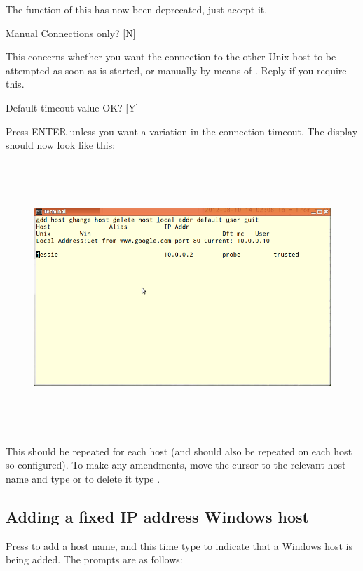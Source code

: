The function of this has now been deprecated, just accept it.

\begin{expara}

Manual Connections only? [N]

\end{expara}

This concerns whether you want the connection to the other Unix host to be attempted as soon as \ProductName{} is started, or manually by means of \PrBtconn. Reply  if you require this.

\begin{expara}

Default timeout value OK? [Y]

\end{expara}

Press ENTER unless you want a variation in the connection timeout. The display should now look like this:

\begin{figure}
\centering
\includegraphics[width=16.999cm,height=10.169cm]{img/he2.png}
\end{figure}
This should be repeated for each host (and should also be repeated on each host so configured). To make any amendments, move the cursor to
the relevant host name and type  or to delete it type .

\subsection{Adding a fixed IP address Windows host}
Press  to add a host name, and this time type
 to indicate that a Windows host is being added.
The prompts are as follows:

